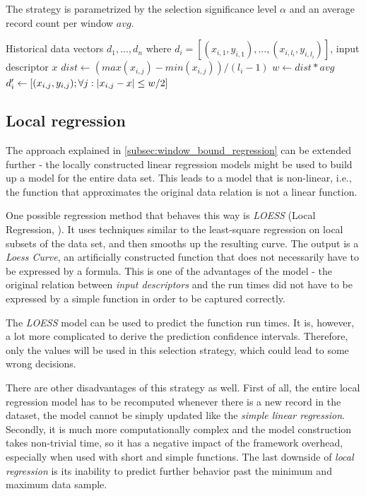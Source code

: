 The strategy is parametrized by the selection significance level $\alpha$ and an average record count per window $avg$.

\begin{algorithmic}[1] %
	\INPUT Historical data vectors $d_1,...,d_n$ where $d_i = [(x_{i,1}, y_{i,1}),...,(x_{i,l_i}, y_{i,l_i})]$, input descriptor $x$
	\State $dist \gets (max(x_{i,j}) - min(x_{i,j})) / (l_i-1)$
	\State $w \gets dist * avg$
	\State $d'_i \gets [(x_{i,j}, y_{i, j}); \forall j: \left|{x_{i,j} - x}\right| \leq w/2]$
	\EndFor
	\State {}
\end{algorithmic}

\subsection{Local regression}
\label{subsec:local_regression}

The approach explained in \ref{subsec:window_bound_regression} can be extended further - the locally constructed linear regression models might be used to build up a model for the entire data set. This leads to a model that is non-linear, i.e., the function that approximates the original data relation is not a linear function.

One possible regression method that behaves this way is \textit{LOESS} (Local Regression, \cite{cleveland_locally_1988,cleveland_regression_1988,cleveland_computational_1991}). It uses techniques similar to the least-square regression on local subsets of the data set, and then smooths up the resulting curve. The output is a \textit{Loess Curve}, an artificially constructed function that does not necessarily have to be expressed by a formula. This is one of the advantages of the model - the original relation between \textit{input descriptors} and the run times did not have to be expressed by a simple function in order to be captured correctly.

The \textit{LOESS} model can be used to predict the function run times. It is, however, a lot more complicated to derive the prediction confidence intervals. Therefore, only the values will be used in this selection strategy, which could lead to some wrong decisions.

There are other disadvantages of this strategy as well. First of all, the entire local regression model has to be recomputed whenever there is a new record in the dataset, the model cannot be simply updated like the \textit{simple linear regression}. Secondly, it is much more computationally complex and the model construction takes non-trivial time, so it has a negative impact of the framework overhead, especially when used with short and simple functions. The last downside of \textit{local regression} is its inability to predict further behavior past the minimum and maximum data sample.

